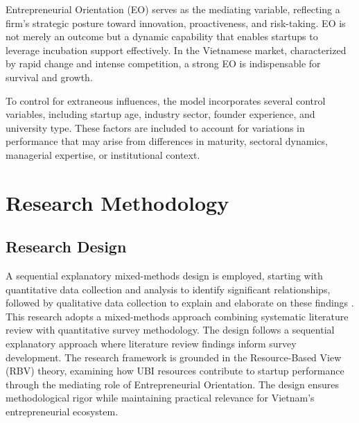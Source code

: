 \documentclass[../Main.tex]{subfiles}
\begin{document}
    Entrepreneurial Orientation (EO) serves as the mediating variable, reflecting a firm's strategic posture toward innovation, proactiveness, and risk-taking. EO is not merely an outcome but a dynamic capability that enables startups to leverage incubation support effectively. In the Vietnamese market, characterized by rapid change and intense competition, a strong EO is indispensable for survival and growth.

    To control for extraneous influences, the model incorporates several control variables, including startup age, industry sector, founder experience, and university type. These factors are included to account for variations in performance that may arise from differences in maturity, sectoral dynamics, managerial expertise, or institutional context.

    \section{Research Methodology}
    \label{section:4.2_Research_methodology}

    \subsection{Research Design}
    \label{subsection:4.2.1_Research_design}
    A sequential explanatory mixed-methods design is employed, starting with quantitative data collection and analysis to identify significant relationships, followed by qualitative data collection to explain and elaborate on these findings \autocite{creswell2014research}. This research adopts a mixed-methods approach combining systematic literature review with quantitative survey methodology. The design follows a sequential explanatory approach where literature review findings inform survey development. The research framework is grounded in the Resource-Based View (RBV) theory, examining how UBI resources contribute to startup performance through the mediating role of Entrepreneurial Orientation. The design ensures methodological rigor while maintaining practical relevance for Vietnam's entrepreneurial ecosystem.
\end{document}
